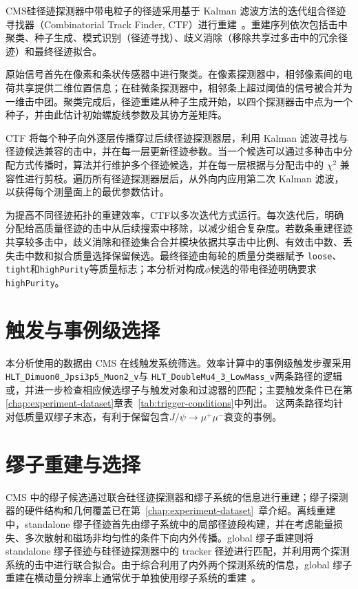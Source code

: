 CMS硅径迹探测器中带电粒子的径迹采用基于 Kalman 滤波方法的迭代组合径迹寻找器（Combinatorial Track Finder, CTF）进行重建~\cite{Fruhwirth:1987:Kalman,CMS_TDR_CH6_TRACKING}。重建序列依次包括击中聚类、种子生成、模式识别（径迹寻找）、歧义消除（移除共享过多击中的冗余径迹）和最终径迹拟合。

原始信号首先在像素和条状传感器中进行聚类。在像素探测器中，相邻像素间的电荷共享提供二维位置信息；在硅微条探测器中，相邻条上超过阈值的信号被合并为一维击中团。聚类完成后，径迹重建从种子生成开始，以四个探测器击中点为一个种子，并由此估计初始螺旋线参数及其协方差矩阵。

CTF 将每个种子向外逐层传播穿过后续径迹探测器层，利用 Kalman 滤波寻找与径迹候选兼容的击中，并在每一层更新径迹参数。当一个候选可以通过多种击中分配方式传播时，算法并行维护多个径迹候选，并在每一层根据与分配击中的 $\chi^2$ 兼容性进行剪枝。遍历所有径迹探测器层后，从外向内应用第二次 Kalman 滤波，以获得每个测量面上的最优参数估计。

为提高不同径迹拓扑的重建效率，CTF以多次迭代方式运行。每次迭代后，明确分配给高质量径迹的击中从后续搜索中移除，以减少组合复杂度。若数条重建径迹共享较多击中，歧义消除和径迹集合合并模块依据共享击中比例、有效击中数、丢失击中数和拟合质量选择保留候选。最终径迹由每轮的质量分类器赋予
\texttt{loose}、\texttt{tight}和\texttt{highPurity}等质量标志；本分析对构成$\phi$候选的带电径迹明确要求\texttt{highPurity}。

\section{触发与事例级选择}
\label{sec:trigger-event-selection}

本分析使用的数据由 CMS 在线触发系统筛选。效率计算中的事例级触发步骤采用
\texttt{HLT\_Dimuon0\_Jpsi3p5\_Muon2\_v}与
\texttt{HLT\_DoubleMu4\_3\_LowMass\_v}两条路径的逻辑或，并进一步检查相应候选缪子与触发对象和过滤器的匹配；主要触发条件已在第\ref{chap:experiment-dataset}章表~\ref{tab:trigger-conditions}中列出。
这两条路径均针对低质量双缪子末态，有利于保留包含$J/\psi\to\mu^+\mu^-$衰变的事例。

\section{缪子重建与选择}
\label{sec:muon-reco-selection}

CMS 中的缪子候选通过联合硅径迹探测器和缪子系统的信息进行重建；缪子探测器的硬件结构和几何覆盖已在第~\ref{chap:experiment-dataset}~章介绍。离线重建中，standalone 缪子径迹首先由缪子系统中的局部径迹段构建，并在考虑能量损失、多次散射和磁场非均匀性的条件下向内外传播。global 缪子重建则将 standalone 缪子径迹与硅径迹探测器中的 tracker 径迹进行匹配，并利用两个探测系统的击中进行联合拟合。由于综合利用了内外两个探测系统的信息，global 缪子重建在横动量分辨率上通常优于单独使用缪子系统的重建~\cite{CMS_TDR_CH9_MUONS,CMS_MUON_PERF_13TEV}。

